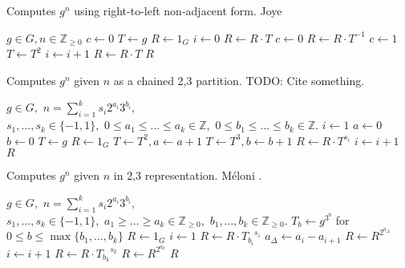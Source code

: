 \documentclass{ucalgthes1}
\theoremstyle{plain}
\theoremstyle{definition}
\newcommand{\ZZ}{\mathbb{Z}}
\newcommand{\ZZgez}{\mathbb{Z}_{\ge 0}}
\newcommand{\floor}[1]{\left\lfloor #1 \right\rfloor}
\begin{document}
\begin{algorithm}[h]
\caption{Computes $g^n$ using right-to-left non-adjacent form. Joye \cite{Joye2000}}
\label{alg:nafR2LImmutable}
\begin{algorithmic}[1]
\REQUIRE $g \in G, n \in \ZZgez$
\STATE $c \gets 0$ 
\STATE $T \gets g$ 
\STATE $R \gets 1_G$
\STATE $i \gets 0$
	\IF {$\floor{n/2^i}+c \equiv 1 \pmod 4$}
		\STATE $R \gets R \cdot T$
		\STATE $c \gets 0$
	\ELSIF {$\floor{n/2^i}+c \equiv 3 \pmod 4$}
		\STATE $R \gets R \cdot T^{-1}$
		\STATE $c \gets 1$
	\ENDIF
	\STATE $T \gets T^2$
	\STATE $i \gets i+1$
\ENDWHILE
{} \STATE $R \gets R \cdot T$ \ENDIF
\RETURN $R$
\end{algorithmic}
\end{algorithm}


\begin{algorithm}[h]
\caption{Computes $g^n$ given $n$ as a chained 2,3 partition. TODO: Cite something.}
\label{alg:expWithChain}
\begin{algorithmic}[1]
\REQUIRE $g \in G,$ 
$n = \sum_{i=1}^k s_i2^{a_i}3^{b_i},$ \\
$s_1,...,s_k \in \{-1, 1\},$ 
$0 \le a_1 \le ...\le a_k \in \ZZ,$ 
$0 \le b_1 \le ... \le b_k \in \ZZ.$
\STATE $i \gets 1$
\STATE $a \gets 0$ 
\STATE $b \gets 0$ 
\STATE $T \gets g$ 
\STATE $R \gets 1_G$
		\STATE $T \gets T^2, a \gets a + 1$
	\ENDWHILE
		\STATE $T \gets T^3, b \gets b + 1$
	\ENDWHILE
	\STATE $R \gets R \cdot T^{s_i}$ 
	\STATE $i \gets i + 1$
\ENDWHILE
\RETURN $R$
\end{algorithmic}
\end{algorithm}

\begin{algorithm}[h]
\caption{Computes $g^n$ given $n$ in 2,3 representation. M\'{e}loni \cite[Section 3.2]{Meloni2009}.}
\label{alg:yaos}
\begin{algorithmic}[1]
\REQUIRE $g \in G,$ 
$n = \sum_{i=1}^k s_i2^{a_i}3^{b_i},$ \\
$s_1,...,s_k \in \{-1, 1\},$ 
$a_1 \ge ... \ge a_k \in \ZZgez,$ 
$b_1,...,b_k \in \ZZgez.$
\STATE $T_b \gets g^{3^b}$ for $0 \le b \le \max \{ b_1, ..., b_k \}$ 
\STATE $R \gets 1_G$
\STATE $i \gets 1$
	\STATE $R \gets R \cdot {T_{b_i}}^{s_i}$ 
	\STATE $a_\Delta \gets a_i - a_{i+1}$
	\STATE $R \gets R ^ {2^{a_\Delta}}$ 
	\STATE $i \gets i + 1$
\ENDWHILE
\STATE $R \gets R \cdot {T_{b_k}}^{s_k}$
\STATE $R \gets R ^ {2^{a_k}}$ 
\RETURN $R$
\end{algorithmic}
\end{algorithm}
\end{document}
